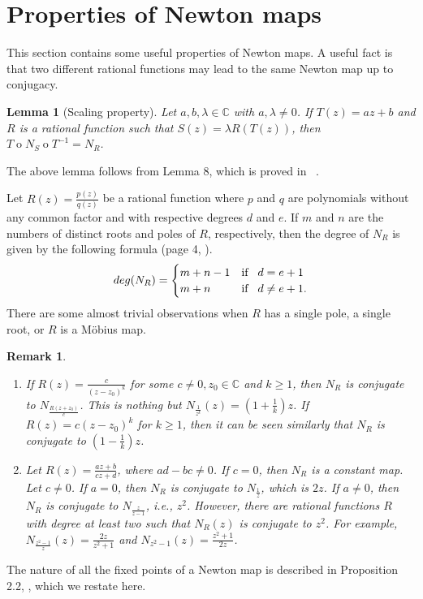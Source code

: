 \documentclass[12pt]{article}
\newtheorem{lem}{Lemma}[section]
\newtheorem{rem}{Remark}[section]
\numberwithin{equation}{section}
\begin{document}
\section{ Properties of Newton maps}\label{Sec2_Prop_N_map}
This section contains some useful properties of Newton maps. A useful fact is that two different rational functions may lead to the same Newton map up to conjugacy.
\begin{lem}[Scaling property] Let $a, b, \lambda \in \mathbb{C}$ with $a, \lambda \neq 0$. If $T(z)=az+b$ and $R$ is a rational function such that $S(z)=\lambda R(T(z))$, then $T \operatorname{o} N_S\operatorname{o}T^{-1}=N_R$.\label{scaling}
\end{lem}
The above lemma follows from Lemma 8, which is proved in ~\cite{BH2003}.
\par 
Let $R(z)=\frac{p(z)}{q(z)}$ be a rational function where $p$ and $q$ are polynomials without any common factor and with respective degrees $d$ and $e$. If $m$ and $n$ are the numbers of distinct roots and poles of $R$, respectively, then the degree of $N_R$ is given by the following formula (page 4, \cite{Nayak_Pal2022}).
\begin{equation}\label{deg_N_R}
deg(N_R)=\begin{cases}
m+n-1  &\mbox{if} \hspace{0.3 cm}  d=e+1 \\
m+n  &\mbox{if} \hspace{0.3 cm}   d\neq e+1. 
\end{cases}
\end{equation}
There are some almost trivial observations when $R$ has a single pole, a single root, or $R$ is a M\"{o}bius map.
\begin{rem}
\begin{enumerate} Using the Scaling property (see Lemma~\ref{scaling}), we have the following.
\item If $R(z) =\frac{c}{(z-z_0)^k}$ for some $c \neq 0,z_0 \in \mathbb{C}$ and $ k \geq 1$, then $N_R $ is conjugate to $N_{\frac{R(z+z_0)}{c}}$. This is nothing but $N_{\frac{1}{z^k}}(z)=(1+\frac{1}{k})z$. If $R(z)=c  (z-z_0)^k$ for $k \geq 1$, then it can be seen similarly that $N_R$ is conjugate to $(1-\frac{1}{k})z$.
\item Let $R(z)=\frac{az+b}{cz+d}$, where $ad-bc\neq 0$. If $c=0$, then $N_R$ is a constant map. Let $c\neq 0$.
If $a=0$, then $N_R$ is conjugate to  $N_{\frac{1}{z}}$, which is $2z$. If $a\neq 0$, then  $N_R$ is conjugate to $N_{\frac{z}{z-1}}$, i.e.,  $z^2$. However, there are rational functions $R$ with degree at least two such that $N_R (z)$ is conjugate to $z^2$. For example,  $N_{\frac{ z^2-1}{z}}(z)=\frac{2z}{z^2 +1}$ and $N_{z^2-1}(z)=\frac{z^2 +1}{2z}$.
	\end{enumerate}
	\label{NM-linear}
	\end{rem}
The nature of all the fixed points of a Newton map is described in Proposition 2.2, \cite{Nayak_Pal2022}, which we restate here. 
\end{document}
